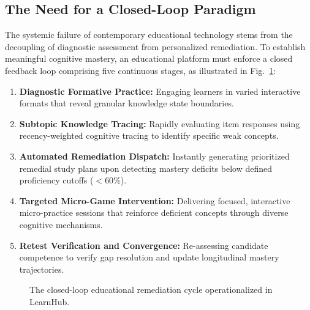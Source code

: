 \documentclass[journal]{IEEEtran}
\begin{document}
\subsection{The Need for a Closed-Loop Paradigm}
The systemic failure of contemporary educational technology stems from the decoupling of diagnostic assessment from personalized remediation. To establish meaningful cognitive mastery, an educational platform must enforce a closed feedback loop comprising five continuous stages, as illustrated in Fig.~\ref{fig:closed_loop_concept}:
\begin{enumerate}
\item \textbf{Diagnostic Formative Practice:} Engaging learners in varied interactive formats that reveal granular knowledge state boundaries.
\item \textbf{Subtopic Knowledge Tracing:} Rapidly evaluating item responses using recency-weighted cognitive tracing to identify specific weak concepts.
\item \textbf{Automated Remediation Dispatch:} Instantly generating prioritized remedial study plans upon detecting mastery deficits below defined proficiency cutoffs ($<60\%$).
\item \textbf{Targeted Micro-Game Intervention:} Delivering focused, interactive micro-practice sessions that reinforce deficient concepts through diverse cognitive mechanisms.
\item \textbf{Retest Verification and Convergence:} Re-assessing candidate competence to verify gap resolution and update longitudinal mastery trajectories.
\end{enumerate}
\begin{figure}[!t]
\centering
{}
\caption{The closed-loop educational remediation cycle operationalized in LearnHub.}
\label{fig:closed_loop_concept}
\end{figure}
\end{document}
